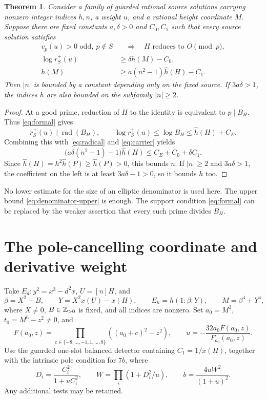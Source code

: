 \documentclass[11pt,a4paper]{article}
\newtheorem{theorem}{Theorem}[section]
\begin{document}
\begin{theorem}\label{thm:general}
Consider a family of guarded rational source solutions carrying
nonzero integer indices $h,n$, a weight $u$, and a rational
height coordinate $M$. Suppose there are fixed constants
$a,\delta>0$ and $C_0,C_1$ such that every source solution satisfies
\begin{align}
 v_p(u)>0\text{ odd},\ p\notin S
       &\quad\Longrightarrow\quad H\text{ reduces to }O\pmod p,
                                                        \label{eq:formal}\\
 \log r_S^+(u)&\ge\delta h(M)-C_0,                       \label{eq:radical}\\
 h(M)&\ge a(n^2-1)\widehat h(H)-C_1.                    \label{eq:carrier}
\end{align}
Then $|n|$ is bounded by a constant depending only on the fixed
source. If $3a\delta>1$, the indices $h$ are also bounded on
the subfamily $|n|\ge2$.
\end{theorem}
\begin{proof}
At a good prime, reduction of $H$ to the identity is equivalent
to $p\mid B_H$. Thus \eqref{eq:formal} gives
\[
          r_S^+(u)\mid\operatorname{rad}(B_H),\qquad
          \log r_S^+(u)\le\log B_H\le\widehat h(H)+C_E.
\]
Combining this with \eqref{eq:radical} and \eqref{eq:carrier}
yields
\begin{equation}\label{eq:obstruction}
       \bigl(a\delta(n^2-1)-1\bigr)\widehat h(H)
                                  \le C_E+C_0+\delta C_1.
\end{equation}
Since $\widehat h(H)=h^2\widehat h(P)\ge\widehat h(P)>0$,
this bounds $n$. If $|n|\ge2$ and $3a\delta>1$, the coefficient
on the left is at least $3a\delta-1>0$, so it bounds $h$ too.
\end{proof}

No lower estimate for the size of an elliptic denominator is
used here. The upper bound \eqref{eq:denominator-upper} is
enough. The support condition \eqref{eq:formal} can be replaced
by the weaker assertion that every such prime divides $B_H$.

\section{The pole-cancelling coordinate and derivative weight}

Take $E_d:y^2=x^3-d^2x$, $U=[n]H$, and
\[
 \beta=X^2+B,\qquad Y=X^2x(U)-x(H),\qquad
 E_h=h(1:\beta:Y),\qquad M=\beta^4+Y^4,
\]
where $X\ne0$, $B\in\mathbb Z_{>0}$ is fixed, and all indices are
nonzero. Set $a_0=M^3$, $t_0=M^6-z^2\ne0$, and
\[
 F(a_0,z)=\prod_{c\in\{-8,\ldots,-1,1,\ldots,8\}}
                    ((a_0+c)^2-z^2),\qquad
 u=-\frac{32a_0F(a_0,z)}{F_{a_0}(a_0,z)}.
\]
Use the guarded one-slot balanced detector containing
$C_1=1/x(H)$, together with the intrinsic pole condition for
$7b$, where
\[
 D_i=\frac{C_i^2}{1+uC_i^2},\qquad
 W=\prod_i(1+D_i^2/u),\qquad
 b=\frac{4uW^2}{(1+u)^2}.
\]
Any additional tests may be retained.
\end{document}
